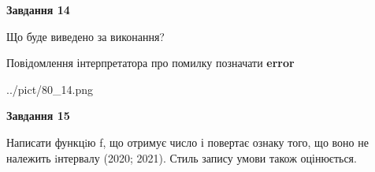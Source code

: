 \documentclass[11pt, ukrainian]{article}
\begin{document}
{\begin {large}
{\begin {center}\textbf{Завдання 14}\end {center}}\par
Що буде виведено за виконання? \par
Повідомлення інтерпретатора про помилку позначати \textbf{error}

\begin{center}
	{../pict/80_14.png}
\end{center}
\newpage

{\begin {center}\textbf{Завдання 15}\end {center}}\par

Написати функцiю f, що отримує число і повертає ознаку того, що воно не належить iнтервалу (2020; 2021). Стиль запису умови також оцінюється.\par
\newpage

\end {large}}
\end{document}
